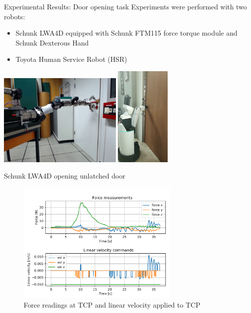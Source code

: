 \documentclass[aspectratio=169]{beamer}
\begin{document}
\begin{frame}{Experimental Results: Door opening task}
	\vspace{-0.5cm}
	Experiments were performed with two robots:
	\begin{itemize}
		\small
		\item Schunk LWA4D equipped with Schunk FTM115 force torque module and Schunk Dexterous Hand 
		\item Toyota Human Service Robot (HSR)
	\end{itemize}
	\vspace{-0.4cm}
	\centering
	\includegraphics[width=0.45\textwidth]{images/exp/lwa_door}
	\hfil
	\vspace{0.4cm}
	\includegraphics[width=0.2\textwidth]{images/exp/hsr_door} 
\end{frame}

\begin{frame}
	Schunk LWA4D opening unlatched door
	\vspace{-0.5cm}
	\begin{figure}[h]
		\centering
		\includegraphics[width=0.7\textwidth]{images/exp/f-vn.pdf}
			\vspace{-0.3cm}
		\caption{Force readings at TCP and linear velocity applied to TCP}
		\label{EX:f-v}
	\end{figure}
\end{frame}
\end{document}
